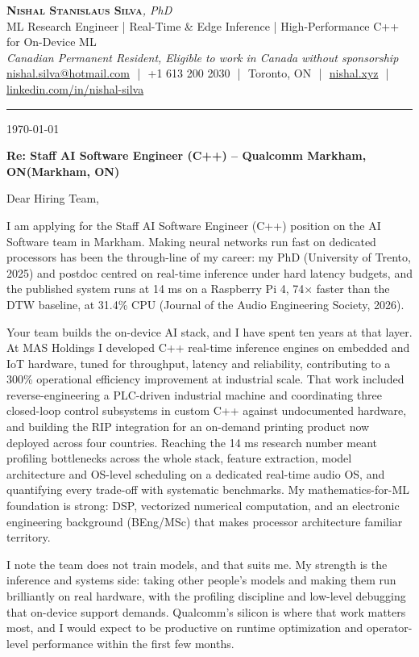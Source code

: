 \documentclass[11pt]{article}
\makeatletter
\newcommand{\clName}{Nishal Stanislaus Silva}
\newcommand{\clEmail}{nishal.silva@hotmail.com}
\newcommand{\clPhone}{+1 613 200 2030}
\newcommand{\clCity}{Toronto, ON}
\newcommand{\clSite}{https://nishal.xyz}
\newcommand{\clLinkedIn}{https://www.linkedin.com/in/nishal-silva}
\newcommand{\clStatus}{Canadian Permanent Resident, Eligible to work in Canada without sponsorship}
\newcommand{\clTagline}{ML Research Engineer | Real-Time \& Edge Inference | High-Performance C++ for On-Device ML}
\newcommand{\clRole}{Staff AI Software Engineer (C++)}
\newcommand{\clCompany}{Qualcomm}
\newcommand{\clTeam}{the AI Software team}
\newcommand{\clAddressee}{Dear Hiring Team,}
\newcommand{\clReqID}{Markham, ON}
\makeatother
\begin{document}
\pagestyle{empty}

\begin{center}
    {\LARGE \scshape \textbf{\clName}}{\large \textit{, PhD}}
    \\[1pt]
    {\small \clTagline}
    \\[1pt]
    {\footnotesize\textit{\clStatus}}
    \\[1pt]
    {\small
    \href{mailto:\clEmail}{\clEmail}
    \,\,|\,\, \clPhone
    \,\,|\,\, \clCity
    \,\,|\,\, \href{\clSite}{nishal.xyz}
    \,\,|\,\, \href{\clLinkedIn}{linkedin.com/in/nishal-silva}}
\end{center}

\rule{\linewidth}{0.4pt}\vspace{0.6em}

\today

\textbf{Re: \clRole{} -- \clCompany{} \ifx\clReqID\empty\else(\clReqID)\fi}

\clAddressee

I am applying for the \clRole{} position on \clTeam{} in Markham. Making neural networks run fast on dedicated processors has been the through-line of my career: my PhD (University of Trento, 2025) and postdoc centred on real-time inference under hard latency budgets, and the published system runs at 14 ms on a Raspberry Pi 4, 74$\times$ faster than the DTW baseline, at 31.4\% CPU (Journal of the Audio Engineering Society, 2026).

Your team builds the on-device AI stack, and I have spent ten years at that layer. At MAS Holdings I developed C++ real-time inference engines on embedded and IoT hardware, tuned for throughput, latency and reliability, contributing to a 300\% operational efficiency improvement at industrial scale. That work included reverse-engineering a PLC-driven industrial machine and coordinating three closed-loop control subsystems in custom C++ against undocumented hardware, and building the RIP integration for an on-demand printing product now deployed across four countries. Reaching the 14 ms research number meant profiling bottlenecks across the whole stack, feature extraction, model architecture and OS-level scheduling on a dedicated real-time audio OS, and quantifying every trade-off with systematic benchmarks. My mathematics-for-ML foundation is strong: DSP, vectorized numerical computation, and an electronic engineering background (BEng/MSc) that makes processor architecture familiar territory.

I note the team does not train models, and that suits me. My strength is the inference and systems side: taking other people's models and making them run brilliantly on real hardware, with the profiling discipline and low-level debugging that on-device support demands. Qualcomm's silicon is where that work matters most, and I would expect to be productive on runtime optimization and operator-level performance within the first few months.
\end{document}
